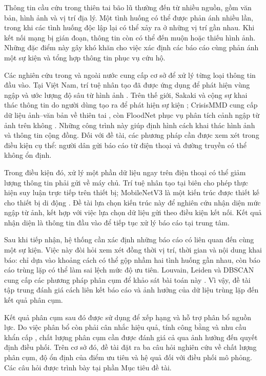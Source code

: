 \label{chap:introduction}


Thông tin cầu cứu trong thiên tai bão lũ thường đến từ nhiều nguồn, gồm văn bản, hình ảnh và vị trí địa lý. Một tình huống có thể được phản ánh nhiều lần, trong khi các tình huống độc lập lại có thể xảy ra ở những vị trí gần nhau. Khi kết nối mạng bị gián đoạn, thông tin còn có thể đến muộn hoặc thiếu hình ảnh. Những đặc điểm này gây khó khăn cho việc xác định các báo cáo cùng phản ánh một sự kiện và tổng hợp thông tin phục vụ cứu hộ.

Các nghiên cứu trong và ngoài nước cung cấp cơ sở để xử lý từng loại thông tin đầu vào. Tại Việt Nam, trí tuệ nhân tạo đã được ứng dụng để phát hiện vùng ngập và ước lượng độ sâu từ hình ảnh \citep{doan2025sar,ngo2025urban}. Trên thế giới, Sakaki và cộng sự khai thác thông tin do người dùng tạo ra để phát hiện sự kiện \citep{sakaki2010earthquake}; CrisisMMD cung cấp dữ liệu ảnh--văn bản về thiên tai \citep{alam2018crisismmd}, còn FloodNet phục vụ phân tích cảnh ngập từ ảnh trên không \citep{rahnemoonfar2021floodnet}. Những công trình này giúp định hình cách khai thác hình ảnh và thông tin cộng đồng. Đối với đề tài, các phương pháp cần được xem xét trong điều kiện cụ thể: người dân gửi báo cáo từ điện thoại và đường truyền có thể không ổn định.

Trong điều kiện đó, xử lý một phần dữ liệu ngay trên điện thoại có thể giảm lượng thông tin phải gửi về máy chủ. Trí tuệ nhân tạo tại biên cho phép thực hiện suy luận trực tiếp trên thiết bị; MobileNetV3 là một kiến trúc được thiết kế cho thiết bị di động \citep{howard2019mobilenetv3}. Đề tài lựa chọn kiến trúc này để nghiên cứu nhận diện mức ngập từ ảnh, kết hợp với việc lựa chọn dữ liệu gửi theo điều kiện kết nối. Kết quả nhận diện là thông tin đầu vào để tiếp tục xử lý báo cáo tại trung tâm.

Sau khi tiếp nhận, hệ thống cần xác định những báo cáo có liên quan đến cùng một sự kiện. Việc này đòi hỏi xem xét đồng thời vị trí, thời gian và nội dung khai báo: chỉ dựa vào khoảng cách có thể gộp nhầm hai tình huống gần nhau, còn báo cáo trùng lặp có thể làm sai lệch mức độ ưu tiên. Louvain, Leiden và DBSCAN cung cấp các phương pháp phân cụm để khảo sát bài toán này \citep{blondel2008louvain,traag2019leiden,ester1996dbscan}. Vì vậy, đề tài tập trung đánh giá cách liên kết báo cáo và ảnh hưởng của dữ liệu trùng lặp đến kết quả phân cụm.

Kết quả phân cụm sau đó được sử dụng để xếp hạng và hỗ trợ phân bổ nguồn lực. Do việc phân bổ còn phải cân nhắc hiệu quả, tính công bằng và nhu cầu khẩn cấp \citep{gralla2014review}, chất lượng phân cụm cần được đánh giá cả qua ảnh hưởng đến quyết định điều phối. Trên cơ sở đó, đề tài đặt ra ba câu hỏi nghiên cứu về chất lượng phân cụm, độ ổn định của điểm ưu tiên và hệ quả đối với điều phối mô phỏng. Các câu hỏi được trình bày tại phần Mục tiêu đề tài.


